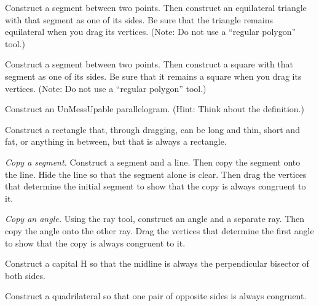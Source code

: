\documentclass[nooutcomes]{ximera}
\begin{document}
\begin{problem}
Construct a segment between two points.  Then construct an equilateral triangle with that segment as one of its sides.  Be sure that the triangle remains equilateral when you drag its vertices.   (Note:  Do not use a ``regular polygon'' tool.)
\end{problem}

\begin{problem}
Construct a segment between two points.  Then construct a square with that segment as one of its sides.  Be sure that it remains a square when you drag its vertices.  (Note:  Do not use a ``regular polygon'' tool.)
\end{problem}

\begin{problem}
Construct an UnMessUpable parallelogram.  (Hint:  Think about the definition.)  
\end{problem}

\begin{problem}
Construct a rectangle that, through dragging, can be long and thin, short and fat, or anything in between, but that is always a rectangle.
\end{problem}

\begin{problem}
\emph{Copy a segment.}  Construct a segment and a line.  Then copy the segment onto the line.  Hide the line so that the segment alone is clear.  Then drag the vertices that determine the initial segment to show that the copy is always congruent to it.  
\end{problem}

\begin{problem}
\emph{Copy an angle.}  Using the ray tool, construct an angle and a separate ray.  Then copy the angle onto the other ray.  Drag the vertices that determine the first angle to show that the copy is always congruent to it.  
\end{problem}

\begin{problem}
Construct a capital H so that the midline is always the perpendicular bisector of both sides.  
\end{problem}

\begin{problem}
Construct a quadrilateral so that one pair of opposite sides is always congruent.  
\end{problem}
\end{document}
